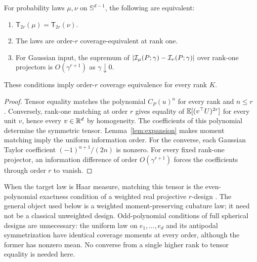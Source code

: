 \begin{lemma}\label{lem:characterization}
For probability laws $\mu,\nu$ on $\mathbb S^{d-1}$, the following are equivalent:
\begin{enumerate}
\item $\mathsf T_{2r}(\mu)=\mathsf T_{2r}(\nu)$.
\item The laws are order-$r$ coverage-equivalent at rank one.
\item For Gaussian input, the supremum of $|\mathcal I_\mu(P;\gamma)-\mathcal I_\nu(P;\gamma)|$ over rank-one projectors is $O(\gamma^{r+1})$ as $\gamma\downarrow0$.
\end{enumerate}
These conditions imply order-$r$ coverage equivalence for every rank $K$.
\end{lemma}
\begin{proof}
Tensor equality matches the polynomial $C_P(u)^n$ for every rank and $n\le r$. Conversely, rank-one matching at order $r$ gives equality of $\mathbb E[(v^{\top}U)^{2r}]$ for every unit $v$, hence every $v\in\mathbb R^d$ by homogeneity. The coefficients of this polynomial determine the symmetric tensor. Lemma~\ref{lem:expansion} makes moment matching imply the uniform information order. For the converse, each Gaussian Taylor coefficient $(-1)^{n+1}/(2n)$ is nonzero. For every fixed rank-one projector, an information difference of order $O(\gamma^{r+1})$ forces the coefficients through order $r$ to vanish.
\end{proof}

When the target law is Haar measure, matching this tensor is the even-polynomial exactness condition of a weighted real projective $r$-design \cite{hughes2021}. The general object used below is a weighted moment-preserving cubature law; it need not be a classical unweighted design. Odd-polynomial conditions of full spherical designs are unnecessary: the uniform law on $e_1,\ldots,e_d$ and its antipodal symmetrization have identical coverage moments at every order, although the former has nonzero mean. No converse from a single higher rank to tensor equality is needed here.


